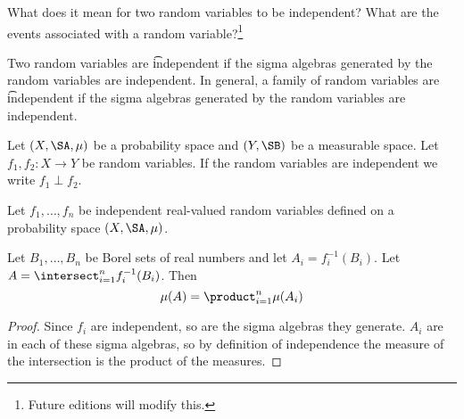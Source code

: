 

What does it mean for two random variables to be independent?
What are the events associated with a random variable?\footnote{Future editions will modify this.}


Two random variables are \t{independent} if the sigma algebras generated by the random variables are independent.
In general, a family of random variables are \t{independent} if the sigma algebras generated by the random variables are independent.


Let $(X, \SA, \mu)$ be a probability space and $(Y, \SB)$ be a measurable space.
Let $f_1,f_2: X \to Y$ be random variables.
If the random variables are independent we write $f_1 \perp f_2$.


\begin{prop}
Let $f_1, \dots, f_n$
be independent real-valued
random variables
defined on a probability
space $(X, \SA, \mu)$.

Let $B_1, \dots, B_n$
be Borel sets of
real numbers
and let $A_i = f_i^{-1}(B_i)$.
Let $A = \intersect_{i = 1}^{n} f_i^{-1}(B_i)$.
Then
\[
  \mu(A)
  = \product_{i = 1}^{n} \mu(A_i)
\]
  \begin{proof}
    Since $f_i$ are independent, so
    are the sigma algebras they generate.
    $A_i$ are in each of these sigma
    algebras, so by definition of
    independence the measure of
    the intersection
    is the product of the measures.
  \end{proof}
\end{prop}
